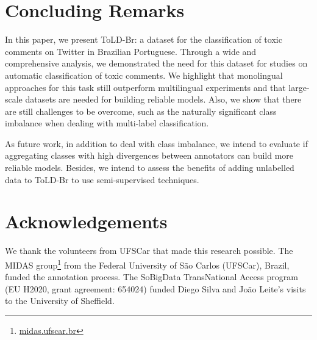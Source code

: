 \documentclass[11pt,a4paper]{article}
\begin{document}
\section{Concluding Remarks}\label{sec:conclusion}
In this paper, we present ToLD-Br: a dataset for the classification of toxic comments on Twitter in Brazilian Portuguese. Through a wide and comprehensive analysis, we demonstrated the need for this dataset for studies on automatic classification of toxic comments. We highlight that monolingual approaches for this task still outperform multilingual experiments and that large-scale datasets are needed for building reliable models. Also, we show that there are still challenges to be overcome, such as the naturally significant class imbalance when dealing with multi-label classification.

As future work, in addition to deal with class imbalance, we intend to evaluate if aggregating classes with high divergences between annotators can build more reliable models. Besides, we intend to assess the benefits of adding unlabelled data to ToLD-Br to use semi-supervised techniques. 

\section{Acknowledgements}\label{sec:acknowledgements}
We thank the volunteers from UFSCar that made this research possible. The MIDAS group\footnote{\url{midas.ufscar.br}} from the Federal University of São Carlos (UFSCar), Brazil, funded the annotation process. The SoBigData TransNational Access program (EU H2020, grant agreement: 654024) funded Diego Silva and Jo\~{a}o Leite's visits to the University of Sheffield.




\end{document}
